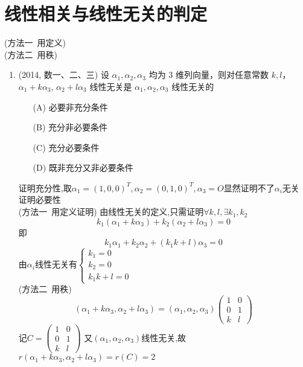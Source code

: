 \documentclass[12pt, a4paper, oneside, UTF8]{ctexbook}
\begin{document}
\section{线性相关与线性无关的判定}
\begin{remark}[相关/无关的判定]
    (方法一\ 用定义) \\
    (方法二\ 用秩)
\end{remark}
\begin{enumerate}[label=\arabic*.,start=4]
    \item (2014, 数一、二、三) 设 $\alpha_1, \alpha_2, \alpha_3$ 均为 3 维列向量，则对任意常数 $k, l$，$\alpha_1 + k\alpha_3$, $\alpha_2 + l\alpha_3$ 线性无关是 $\alpha_1, \alpha_2, \alpha_3$ 线性无关的
    \begin{enumerate}
        \item [(A)] 必要非充分条件
        \item [(B)] 充分非必要条件
        \item [(C)] 充分必要条件
        \item [(D)] 既非充分又非必要条件
    \end{enumerate}
    
    \begin{solution}
    证明充分性,取$\alpha_1=(1,0,0)^T,\alpha_2=(0,1,0)^T,\alpha_3=O$显然证明不了$\alpha_i$无关 \\
    证明必要性 \\
    (方法一\ 用定义证明) 
    由线性无关的定义,只需证明$\forall k,l,\exists k_1,k_2$
    $$
    k_1(\alpha_1+k\alpha_3)+k_2(\alpha_2+l\alpha_3) = 0
    $$
    即
    $$
    k_1\alpha_1 + k_2\alpha_2 + (k_1k+l)\alpha_3 = 0
    $$
    由$\alpha_i$线性无关有$\begin{cases}
        k_1 = 0 \\
        k_2 = 0 \\
        k_1k+l = 0
    \end{cases}$ \\
    (方法二\ 用秩)
    $$
    (\alpha_1+k\alpha_3,\alpha_2+l\alpha_3) = (\alpha_1,\alpha_2,\alpha_3)\begin{pmatrix}
        1 & 0 \\
        0 & 1 \\
        k & l 
    \end{pmatrix}
    $$
    记$C=\begin{pmatrix}
        1 & 0 \\
        0 & 1 \\
        k & l 
    \end{pmatrix}$
    又$(\alpha_1,\alpha_2,\alpha_3)$线性无关,故$r(\alpha_1+k\alpha_3,\alpha_2+l\alpha_3)=r(C)=2$
    \end{solution}
    

\end{enumerate}
\end{document}

